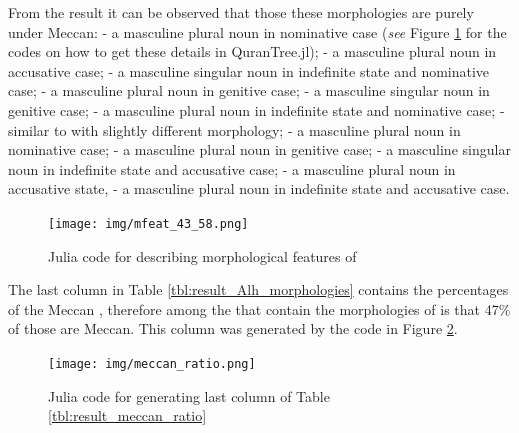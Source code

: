 From the result it can be observed that those these morphologies are purely under Meccan:    - a masculine plural noun in nominative case (\textit{see} Figure \ref{fig:result_mfeat_43_58} for the codes on how to get these details in QuranTree.jl);   - a masculine plural noun in accusative case;   - a masculine singular noun in indefinite state and nominative case;   - a masculine plural noun in genitive case;   - a masculine singular noun in genitive case;   - a masculine plural noun in indefinite state and nominative case;   - similar to   with slightly different morphology;   - a masculine plural noun in nominative case;   - a masculine plural noun in genitive case;   - a masculine singular noun in indefinite state and accusative case;   - a masculine plural noun in accusative state,   - a masculine plural noun in indefinite state and accusative case.

\begin{figure}[!t]
    \centering
    \texttt{[image: img/mfeat\_43\_58.png]}
    \caption{Julia code for describing morphological features of  }
    \label{fig:result_mfeat_43_58}
\end{figure}

The last column in Table \ref{tbl:result_Alh_morphologies} contains the percentages of the Meccan  , therefore among the   that contain the morphologies of   is that 47\% of those are Meccan. This column was generated by the code in Figure \ref{fig:result_meccan_ratio}.

\begin{figure}[!t]
    \centering
    \texttt{[image: img/meccan\_ratio.png]}
    \caption{Julia code for generating last column of Table \ref{tbl:result_meccan_ratio}}
    \label{fig:result_meccan_ratio}
\end{figure}


